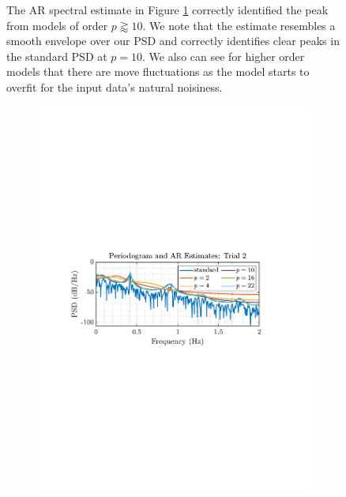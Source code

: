 \documentclass[12pt]{article}
\begin{document}
\begin{figure}[H]
			\begin{minipage}{0.46\textwidth}
				The AR spectral estimate in Figure \ref{fig: 1-5c} correctly identified the peak from models of order $p\gtrapprox10$. We note that the estimate resembles a smooth envelope over our PSD and correctly identifies clear peaks in the standard PSD at $p=10$. We also can see for higher order models that there are move fluctuations as the model starts to overfit for the input data's natural noisiness. \\
			\end{minipage}%
			\begin{minipage}{0.04\textwidth}
				\hspace*{0.04\textwidth}
			\end{minipage}%
			\begin{minipage}{0.49\textwidth}
				\begin{subfigure}{\textwidth}
					\includegraphics[trim={2.2cm 11.2cm 3.15cm  11.2cm}, clip, width=\textwidth]{../MATLAB/figures/q1_5c_fig02.pdf} 
					\caption{}
				\end{subfigure}%
				\captionsetup{justification=centering}
				\label{fig: 1-5c}
			\end{minipage}%
		\end{figure}
	
\end{document}
